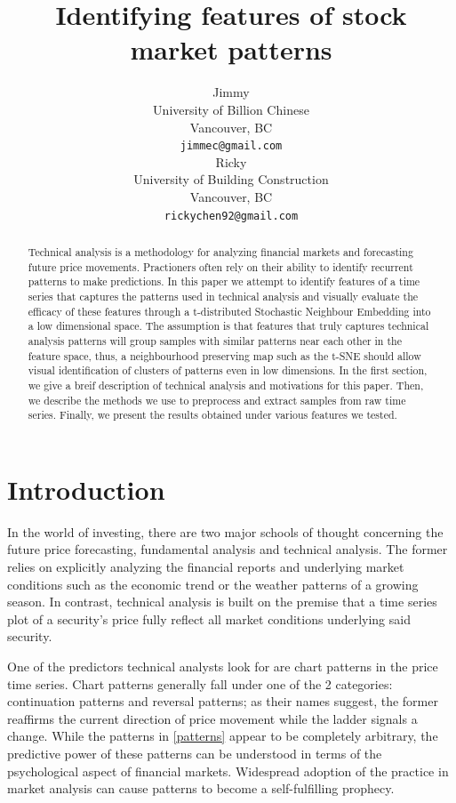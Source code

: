 \documentclass{article} %
\title{Identifying features of stock market patterns}
\author{
Jimmy\\
University of Billion Chinese\\
Vancouver, BC \\
\texttt{jimmec@gmail.com} \\
\And
Ricky\\
University of Building Construction\\
Vancouver, BC \\
\texttt{rickychen92@gmail.com} \\
}
\begin{document}
\maketitle

\begin{abstract}
Technical analysis is a methodology for analyzing financial markets and forecasting future price movements. Practioners often rely on their ability to identify recurrent patterns to make predictions. In this paper we attempt to identify features of a time series that captures the patterns used in technical analysis and visually evaluate the efficacy of these features through a t-distributed Stochastic Neighbour Embedding \cite{Hinton08tsne} into a low dimensional space. The assumption is that features that truly captures technical analysis patterns will group samples with similar patterns near each other in the feature space, thus, a neighbourhood preserving map such as the t-SNE should allow visual identification of clusters of patterns even in low dimensions. In the first section, we give a breif description of technical analysis and motivations for this paper. Then, we describe the methods we use to preprocess and extract samples from raw time series. Finally, we present the results obtained under various features we tested.
\end{abstract}

\section{Introduction}
In the world of investing, there are two major schools of thought concerning the future price forecasting, fundamental analysis and technical analysis. The former relies on explicitly analyzing the financial reports and underlying market conditions such as the economic trend or the weather patterns of a growing season. In contrast, technical analysis is built on the premise that a time series plot of a security's price fully reflect all market conditions underlying said security. 

One of the predictors technical analysts look for are chart patterns in the price time series. Chart patterns generally fall under one of the 2 categories: continuation patterns and reversal patterns; as their names suggest, the former reaffirms the current direction of price movement while the ladder signals a change. While the patterns in \ref{patterns} appear to be completely arbitrary, the predictive power of these patterns can be understood in terms of the psychological aspect of financial markets. Widespread adoption of the practice in market analysis can cause patterns to become a self-fulfilling prophecy.
\end{document}
